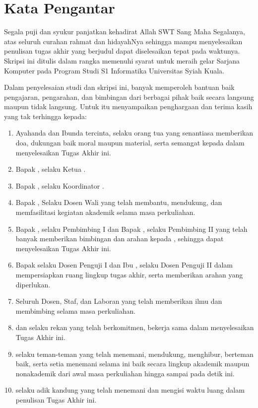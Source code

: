 \chapter*{Kata Pengantar}


Segala puji dan syukur \saya{} panjatkan kehadirat Allah SWT Sang Maha Segalanya, atas seluruh curahan rahmat dan hidayahNya sehingga \saya{} mampu menyelesaikan penulisan tugas akhir yang berjudul \textbf{\Judul} dapat diselesaikan tepat pada waktunya. Skripsi ini ditulis dalam rangka memenuhi syarat untuk meraih gelar Sarjana Komputer pada Program Studi S1 Informatika Universitas Syiah Kuala. 

Dalam penyelesaian studi dan skripsi ini, \saya{} banyak memperoleh bantuan baik pengajaran, pengarahan, dan bimbingan dari berbagai pihak baik secara langsung maupun tidak langsung. Untuk itu \saya{} menyampaikan penghargaan dan terima kasih yang tak terhingga kepada: 

\begin{enumerate}
    \item Ayahanda \ayah{} dan Ibunda \ibu{} tercinta, selaku orang tua \saya{} yang senantiasa memberikan doa, dukungan baik moral maupun material, serta semangat kepada \saya{} dalam menyelesaikan Tugas Akhir ini.
    \item Bapak \kadep{}, selaku Ketua \departemen{} \universitas.
    \item Bapak \kaprodi{}, selaku Koordinator \programstudi{} \universitas{}.
    \item Bapak \doswal{}, Selaku Dosen Wali yang telah membantu, mendukung, dan memfasilitasi kegiatan akademik selama masa perkuliahan.
    \item Bapak \pembimbingSatu{}, selaku Pembimbing I dan Bapak \pembimbingDua{}, selaku Pembimbing II yang telah banyak memberikan bimbingan dan arahan kepada \saya{}, sehingga \saya{} dapat menyelesaikan Tugas Akhir ini.
    \item Bapak \pengujiSatu{} selaku Dosen Penguji I dan Ibu \pengujiDua{}, selaku Dosen Penguji II dalam mempersiapkan ruang lingkup tugas akhir, serta memberikan arahan yang diperlukan.
    \item Seluruh Dosen, Staf, dan Laboran \programstudi{} \FakultasMIPA{} \universitas{} yang telah memberikan ilmu dan membimbing selama masa perkuliahan.
    \item \rekanSatu{} dan \rekanDua{} selaku rekan \saya{} yang telah berkomitmen, bekerja sama dalam menyelesaikan Tugas Akhir ini.
    \item \masbroo{} selaku teman-teman \Masbroo{} yang telah menemani, mendukung, menghibur, berteman baik, serta setia menemani \saya{} selama ini baik secara lingkup akademik maupun nonakademik dari awal masa perkuliahan hingga sampai pada detik ini.
    \item \adik{} selaku adik kandung yang telah menemani dan mengisi waktu luang \saya{} dalam penulisan Tugas Akhir ini.
\end{enumerate}

